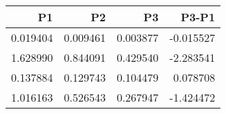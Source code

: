 \begin{tabular}{rrrr}
\toprule
P1 & P2 & P3 & P3-P1 \\
\midrule
0.019404 & 0.009461 & 0.003877 & -0.015527 \\
1.628990 & 0.844091 & 0.429540 & -2.283541 \\
0.137884 & 0.129743 & 0.104479 & 0.078708 \\
1.016163 & 0.526543 & 0.267947 & -1.424472 \\
\bottomrule
\end{tabular}
